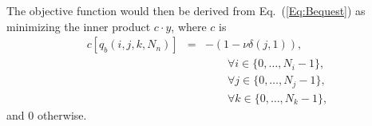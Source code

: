 \documentclass{article}[fleqn,12pt]
\begin{document}
The objective function would then be derived from Eq.~(\ref{Eq:Bequest}) as
minimizing the inner product $c\cdot y$, where $c$ is
\begin{eqnarray}
	\label{Eq:MaxBequest}
	c[q_b(i, j, k, N_n)] &=& -(1 - \nu\delta(j, 1)),\\
	&&\qquad\forall i \in \{0,\ldots, N_i-1\},\nonumber\\
	&&\qquad\forall j \in \{0,\ldots, N_j-1\},\nonumber\\
	&&\qquad\forall k \in \{0,\ldots, N_k-1\},\nonumber
\end{eqnarray}
and 0 otherwise.
\end{document}
